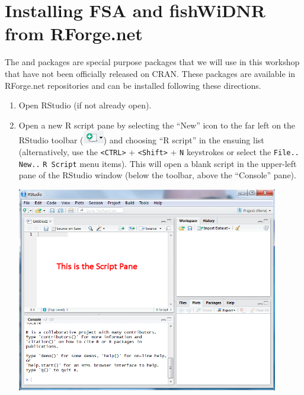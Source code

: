 \documentclass{article}\usepackage[]{graphicx}\usepackage[]{color}
\begin{document}
\newpage
\section{Installing FSA and fishWiDNR from RForge.net}
The  and  packages are special purpose packages that we will use in this workshop that have not been officially released on CRAN.  These packages are available in RForge.net repositories and can be installed following these directions.
\begin{enumerate}
  \item Open RStudio (if not already open).

  \item Open a new R script pane by selecting the ``New'' icon to the far left on the RStudio toolbar (\includegraphics[scale=0.8]{Figs/RStudio_Icon_New.png}) and choosing ``R script'' in the ensuing list (alternatively, use the \verb+<CTRL>+ + \verb+<Shift>+ + \verb+N+ keystrokes or select the \verb+File..+ \verb+New..+ \verb+R Script+ menu items).  This will open a blank script in the upper-left pane of the RStudio window (below the toolbar, above the ``Console'' pane).
\begin{center}
  \includegraphics[width=4.5in]{Figs/RStudio_NewScript.png}
\end{center}


\end{enumerate}
\end{document}
